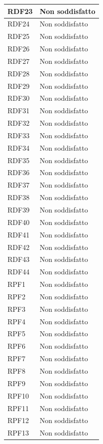 \begin{longtable}{| p{2.5cm} | p{3cm} |}
	RDF23 & Non soddisfatto \\ \hline
	RDF24 & Non soddisfatto \\ \hline
	RDF25 & Non soddisfatto \\ \hline
	RDF26 & Non soddisfatto \\ \hline
	RDF27 & Non soddisfatto \\ \hline
	RDF28 & Non soddisfatto \\ \hline
	RDF29 & Non soddisfatto \\ \hline
	RDF30 & Non soddisfatto \\ \hline
	RDF31 & Non soddisfatto \\ \hline
	RDF32 & Non soddisfatto \\ \hline
	RDF33 & Non soddisfatto \\ \hline
	RDF34 & Non soddisfatto \\ \hline
	RDF35 & Non soddisfatto \\ \hline
	RDF36 & Non soddisfatto \\ \hline
	RDF37 & Non soddisfatto \\ \hline
	RDF38 & Non soddisfatto \\ \hline
	RDF39 & Non soddisfatto \\ \hline
	RDF40 & Non soddisfatto \\ \hline
	RDF41 & Non soddisfatto \\ \hline
	RDF42 & Non soddisfatto \\ \hline
	RDF43 & Non soddisfatto \\ \hline
	RDF44 & Non soddisfatto \\ \hline
	RPF1 & Non soddisfatto \\ \hline
	RPF2 & Non soddisfatto \\ \hline
	RPF3 & Non soddisfatto \\ \hline
	RPF4 & Non soddisfatto \\ \hline
	RPF5 & Non soddisfatto \\ \hline
	RPF6 & Non soddisfatto \\ \hline
	RPF7 & Non soddisfatto \\ \hline
	RPF8 & Non soddisfatto \\ \hline
	RPF9 & Non soddisfatto \\ \hline
	RPF10 & Non soddisfatto \\ \hline
	RPF11 & Non soddisfatto \\ \hline
	RPF12 & Non soddisfatto \\ \hline
	RPF13 & Non soddisfatto \\ \hline

\end{longtable}

